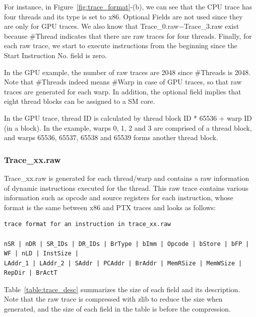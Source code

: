For instance, in Figure~\ref{fig:trace_format}-(b), we can see that the CPU
trace has four threads and its type is set to x86. Optional Fields are not used 
since they are only for GPU traces. We also know that Trace\_0.raw$-$Trace\_3.raw 
exist because \#Thread indicates that there are raw traces for four threads. 
Finally, for each raw trace, we start to execute instructions from the beginning
since the Start Instruction No. field is zero.

In the GPU example, the number of raw traces are 2048 since \#Threads is 2048.
Note that \#Threads indeed means \#Warp in case of GPU traces, so that raw traces
are generated for each warp. In addition, the optional field implies that eight 
thread blocks can be assigned to a SM core. 

In the GPU trace, thread ID is calculated by thread block ID * 65536 + warp ID (in a block). 
In the example, warps 0, 1, 2 and 3 are comprised of a thread block, and warps 65536, 65537, 65538
and 65539 forms another thread block.

\subsubsection{Trace\_xx.raw}

Trace\_xx.raw is generated for each thread/warp and contains a raw information
of dynamic instructions executed for the thread. This raw trace contains various
information such as opcode and source registers for each instruction, whose format 
is the same between x86 and PTX traces and looks as follows:

\smallskip
\begin{lstlisting}
trace format for an instruction in trace_xx.raw

nSR | nDR | SR_IDs | DR_IDs | BrType | bImm | Opcode | bStore | bFP | WF | nLD | InstSize |
LAddr_1 | LAddr_2 | SAddr | PCAddr | BrAddr | MemRSize | MemWSize | RepDir | BrActT 
\end{lstlisting}
\smallskip

Table~\ref{table:trace_desc} summarizes the size of each field and its description.
Note that the raw trace is compressed with zlib to reduce the size when generated, and
the size of each field in the table is before the compression.

